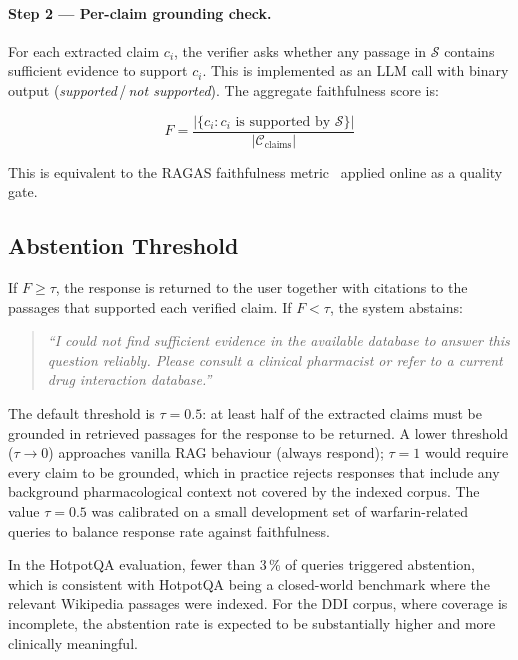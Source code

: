 \paragraph{Step 2 --- Per-claim grounding check.}
For each extracted claim $c_i$, the verifier asks whether any passage in
$\mathcal{S}$ contains sufficient evidence to support $c_i$.
This is implemented as an LLM call with binary output
(\textit{supported}\,/\,\textit{not supported}).
The aggregate faithfulness score is:

\begin{equation}
  F = \frac{|\{c_i : c_i \text{ is supported by } \mathcal{S}\}|}
           {|\mathcal{C}_\text{claims}|}
  \label{eq:faithfulness_score}
\end{equation}

This is equivalent to the RAGAS faithfulness metric~\cite{es2023ragas} applied
online as a quality gate.

\subsection{Abstention Threshold}

If $F \geq \tau$, the response is returned to the user together with citations
to the passages that supported each verified claim.
If $F < \tau$, the system abstains:

\begin{quote}
  \small\itshape
  ``I could not find sufficient evidence in the available database
  to answer this question reliably.
  Please consult a clinical pharmacist or refer to a current drug
  interaction database.''
\end{quote}

The default threshold is $\tau = 0.5$: at least half of the extracted claims
must be grounded in retrieved passages for the response to be returned.
A lower threshold ($\tau \to 0$) approaches vanilla RAG behaviour
(always respond); $\tau = 1$ would require every claim to be grounded,
which in practice rejects responses that include any background pharmacological
context not covered by the indexed corpus.
The value $\tau = 0.5$ was calibrated on a small development set of
warfarin-related queries to balance response rate against faithfulness.

In the HotpotQA evaluation, fewer than 3\,\% of queries triggered abstention,
which is consistent with HotpotQA being a closed-world benchmark where the
relevant Wikipedia passages were indexed.
For the DDI corpus, where coverage is incomplete, the abstention rate is
expected to be substantially higher and more clinically meaningful.

